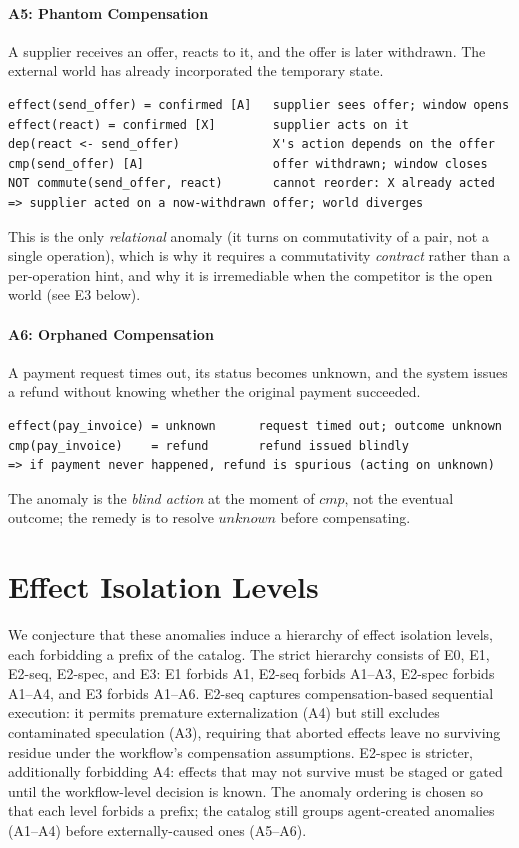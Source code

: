 \documentclass[11pt]{article}
\begin{document}
\paragraph{A5: Phantom Compensation}
A supplier receives an offer, reacts to it, and the offer is later
withdrawn. The external world has already incorporated the temporary
state.
\begin{verbatim}
effect(send_offer) = confirmed [A]   supplier sees offer; window opens
effect(react) = confirmed [X]        supplier acts on it
dep(react <- send_offer)             X's action depends on the offer
cmp(send_offer) [A]                  offer withdrawn; window closes
NOT commute(send_offer, react)       cannot reorder: X already acted
=> supplier acted on a now-withdrawn offer; world diverges
\end{verbatim}
This is the only \emph{relational} anomaly (it turns on commutativity of a
pair, not a single operation), which is why it requires a commutativity
\emph{contract} rather than a per-operation hint, and why it is
irremediable when the competitor is the open world (see E3 below).

\paragraph{A6: Orphaned Compensation}
A payment request times out, its status becomes unknown, and the system
issues a refund without knowing whether the original payment succeeded.
\begin{verbatim}
effect(pay_invoice) = unknown      request timed out; outcome unknown
cmp(pay_invoice)    = refund       refund issued blindly
=> if payment never happened, refund is spurious (acting on unknown)
\end{verbatim}
The anomaly is the \emph{blind action} at the moment of $cmp$, not the
eventual outcome; the remedy is to resolve $unknown$ before compensating.

\section{Effect Isolation Levels}
\label{sec:levels}

We conjecture that these anomalies induce a hierarchy of effect isolation
levels, each forbidding a prefix of the catalog. The strict hierarchy
consists of E0, E1, E2-seq, E2-spec, and E3: E1 forbids A1, E2-seq forbids
A1--A3, E2-spec forbids A1--A4, and E3 forbids A1--A6. E2-seq captures
compensation-based sequential execution: it permits premature
externalization (A4) but still excludes contaminated speculation (A3),
requiring that aborted effects leave no surviving residue under the
workflow's compensation assumptions. E2-spec is stricter, additionally
forbidding A4: effects that may not survive must be staged or gated until
the workflow-level decision is known. The anomaly ordering is chosen so
that each level forbids a prefix; the catalog still groups
agent-created anomalies (A1--A4) before externally-caused ones (A5--A6).
\end{document}
